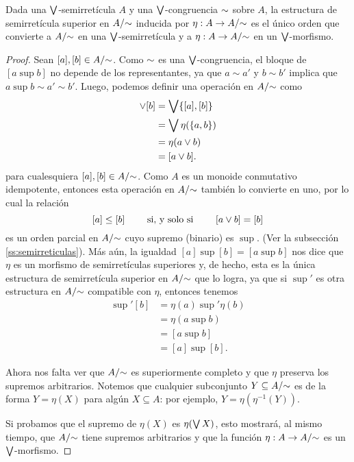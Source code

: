 \begin{lemma}
  \label{lemma:congruencia-produce-cociente}
  Dada una $\bigvee$-semirretícula $A$ y una $\bigvee$-congruencia
  ${\sim}$ sobre $A$, la estructura de semirretícula superior en
  $A/{\sim}$ inducida por $\eta:A\to A/{\sim}$ es el único orden
  que convierte a $A/{\sim}$ en una $\bigvee$-semirretícula y
  a $\eta:A\to A/{\sim}$ en un $\bigvee$-morfismo.
\end{lemma}
\begin{proof}
  Sean $[a],[b]\in A/{\sim}$.
  Como ${\sim}$ es una $\bigvee$-congruencia, el bloque de
  $[a\sup b]$ no depende de los representantes,
  ya que $a\sim a'$ y $b\sim b'$ implica
  que $a\sup b\sim a'\sim b'$.
  Luego, podemos definir una operación en $A/{\sim}$ como
  \begin{align*}
      [a]\sup[b]
      &= \Sup\{[a],[b]\} \\
      &= \Sup\eta(\{a,b\}) \\
      &= \eta(a\sup b) \\
      &= [a\sup b].
  \end{align*}
  para cualesquiera $[a],[b]\in A/{\sim}$.
  Como $A$ es un monoide conmutativo idempotente, entonces esta
  operación en $A/{\sim}$ también lo convierte en uno,
  por lo cual la relación
  \[
      [a]\leq[b] \qquad\text{ si, y solo si }\qquad [a\vee b]=[b]
  \]
  es un orden parcial en $A/{\sim}$ cuyo supremo (binario) es
  $\sup$. (Ver la subsección \ref{ss:semirreticulas}).
  Más aún, la igualdad $[a]\sup[b]=[a\sup b]$ nos dice que $\eta$
  es un morfismo de semirretículas superiores y, de hecho, esta
  es la única estructura de semirretícula superior en $A/{\sim}$
  que lo logra, ya que si $\sup'$ es otra estructura en $A/{\sim}$
  compatible con $\eta$, entonces tenemos
  \begin{align*}
    [a]\sup'[b]
    &= \eta(a)\sup'\eta(b) \\
    &= \eta(a\sup b) \\
    &= [a\sup b] \\
    &= [a]\sup[b].
  \end{align*}
  
  Ahora nos falta ver que $A/{\sim}$ es superiormente completo
  y que $\eta$ preserva los supremos arbitrarios.
  Notemos que cualquier subconjunto $Y\subseteq A/{\sim}$ es de la
  forma $Y=\eta(X)$ para algún $X\subseteq A$: por ejemplo,
  $Y=\eta(\eta^{-1}(Y))$.

  Si probamos que el supremo de $\eta(X)$ es $\eta(\bigvee X)$,
  esto mostrará, al mismo tiempo, que $A/{\sim}$ tiene supremos
  arbitrarios y que la función $\eta:A\to A/{\sim}$ es un
  $\bigvee$-morfismo.
  

\end{proof}

